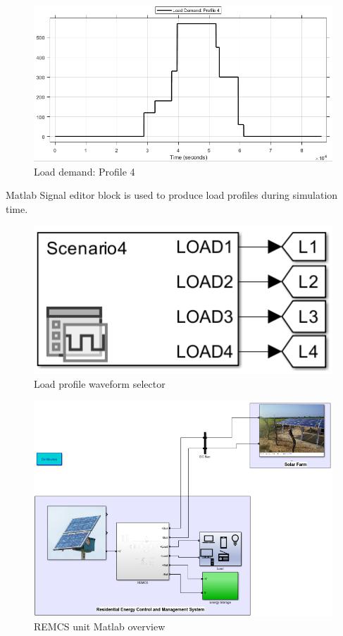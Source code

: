 \begin{figure}[H]
	\centering
	\includegraphics[totalheight=8cm]{Figures/ldp4.png}
	\caption{Load demand: Profile 4}
\end{figure}
Matlab Signal editor block is used to produce load profiles during simulation time.
\begin{figure}[H]
	\centering
	\includegraphics[totalheight=4cm]{Figures/load profile selector.png}
	\caption{Load profile waveform selector}
\end{figure}
\begin{figure}[H]
	\centering
	\includegraphics[totalheight=10cm]{Figures/REMCS.png}
	\caption{REMCS unit Matlab overview}
\end{figure}

